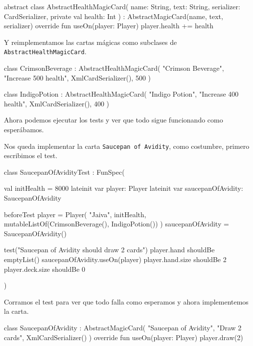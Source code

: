   \begin{kotlin}
    abstract class AbstractHealthMagicCard(
      name: String, text: String, serializer: CardSerializer, private val health: Int
    ) : AbstractMagicCard(name, text, serializer) {
      override fun useOn(player: Player) {
        player.health += health
      }
    }
  \end{kotlin}

  Y reimplementamos las cartas mágicas como subclases de \texttt{AbstractHealthMagicCard}.

  \begin{kotlin}
    class CrimsonBeverage : AbstractHealthMagicCard(
      "Crimson Beverage",
      "Increase 500 health",
      XmlCardSerializer(),
      500
    )
  \end{kotlin}

  \begin{kotlin}
    class IndigoPotion : AbstractHealthMagicCard(
      "Indigo Potion",
      "Increase 400 health",
      XmlCardSerializer(),
      400
    )
  \end{kotlin}

  Ahora podemos ejecutar los tests y ver que todo sigue funcionando como esperábamos.

  Nos queda implementar la carta \texttt{Saucepan of Avidity}, como costumbre, primero
  escribimos el test.

  \begin{kotlin}
    class SaucepanOfAvidityTest : FunSpec({
      val initHealth = 8000
      lateinit var player: Player
      lateinit var saucepanOfAvidity: SaucepanOfAvidity

      beforeTest {
        player = Player(
          "Jaiva",
          initHealth,
          mutableListOf(CrimsonBeverage(), IndigoPotion())
        )
        saucepanOfAvidity = SaucepanOfAvidity()
      }

      test("Saucepan of Avidity should draw 2 cards") {
        player.hand shouldBe emptyList()
        saucepanOfAvidity.useOn(player)
        player.hand.size shouldBe 2
        player.deck.size shouldBe 0
      }
    })
  \end{kotlin}

  Corramos el test para ver que todo falla como esperamos y ahora implementemos la carta.

  \begin{kotlin}
    class SaucepanOfAvidity : AbstractMagicCard(
      "Saucepan of Avidity",
      "Draw 2 cards",
      XmlCardSerializer()
    ) {
      override fun useOn(player: Player) {
        player.draw(2)
      }
    }
  \end{kotlin}
  
